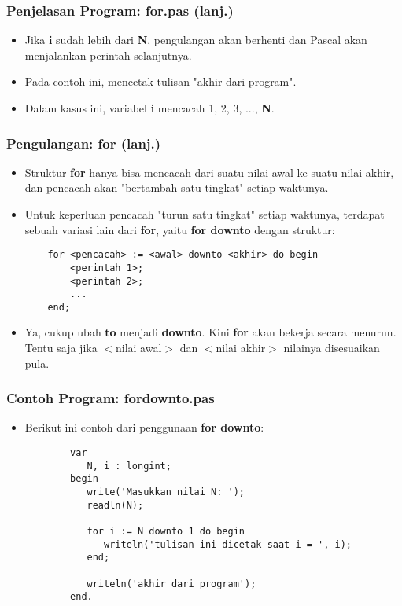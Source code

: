 \documentclass{beamer}
\begin{document}
\begin{frame}
\frametitle{Penjelasan Program: for.pas (lanj.)}
\begin{itemize}
    \item Jika \textbf{i} sudah lebih dari \textbf{N}, pengulangan akan berhenti dan Pascal akan menjalankan perintah selanjutnya.
    \item Pada contoh ini, mencetak tulisan "akhir dari program".
    \item Dalam kasus ini, variabel \textbf{i} mencacah 1, 2, 3, ..., \textbf{N}.
\end{itemize}
\end{frame}

\begin{frame}[fragile]
\frametitle{Pengulangan: for (lanj.)}
\begin{itemize}
    \item Struktur \textbf{for} hanya bisa mencacah dari suatu nilai awal ke suatu nilai akhir, dan pencacah akan "bertambah satu tingkat" setiap waktunya.
    \item Untuk keperluan pencacah "turun satu tingkat" setiap waktunya, terdapat sebuah variasi lain dari \textbf{for}, yaitu \textbf{for downto} dengan struktur:
    \begin{lstlisting}
    for <pencacah> := <awal> downto <akhir> do begin
        <perintah 1>;
        <perintah 2>;
        ...
    end;
    \end{lstlisting}
    \item Ya, cukup ubah \alert{\textbf{to}} menjadi \alert{\textbf{downto}}. Kini \textbf{for} akan bekerja secara menurun. Tentu saja jika $<$nilai awal$>$ dan $<$nilai akhir$>$ nilainya disesuaikan pula.
\end{itemize}
\end{frame}

\begin{frame}[fragile]
\frametitle{Contoh Program: fordownto.pas}
\begin{itemize}
    \item Berikut ini contoh dari penggunaan \textbf{for downto}:
    \begin{lstlisting}
        var
           N, i : longint;
        begin
           write('Masukkan nilai N: ');
           readln(N);

           for i := N downto 1 do begin
              writeln('tulisan ini dicetak saat i = ', i);
           end;

           writeln('akhir dari program');
        end.
    \end{lstlisting}
\end{itemize}
\end{frame}
\end{document}
